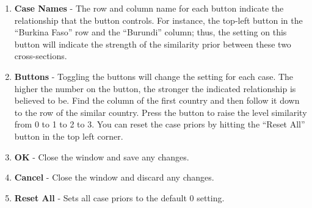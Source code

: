 \documentclass[12pt,titlepage]{article}
\begin{document}
\begin{enumerate}
\item \textbf{Case Names} - The row and column name for each button
  indicate the relationship that the button controls.  For instance,
  the top-left button in the ``Burkina Faso'' row and the ``Burundi''
  column; thus, the setting on this button will indicate the strength
  of the similarity prior between these two cross-sections.
\item \textbf{Buttons} - Toggling the buttons will change the setting
  for each case.  The higher the number on the button, the stronger
  the indicated relationship is believed to be.  Find the column of
  the first country and then follow it down to the row of the similar
  country.  Press the button to raise the level similarity from 0 to 1
  to 2 to 3.  You can reset the case priors by hitting the ``Reset
  All'' button in the top left corner.
\item \textbf{OK} - Close the window and save any changes.
\item \textbf{Cancel} - Close the window and discard any changes.
\item \textbf{Reset All} - Sets all case priors to the default 0
  setting.
\end{enumerate}
\end{document}
